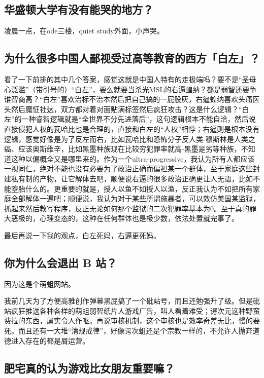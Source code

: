 \documentclass{ctexart}
\begin{document}
	\subsection{华盛顿大学有没有能哭的地方？}
	
	凌晨一点，在ode三楼，quiet study外面，小声哭。
	
	\subsection{为什么很多中国人鄙视受过高等教育的西方「白左」？}
	
	看了一下前排的其中几个答案，感觉这就是中国人特有的走极端吗？要不是“圣母心泛滥”（带引号的）“白左”，要么就要当杀光MSL的右逼蝗纳？都是弱智还要争谁智商高？“白左”喜欢治标不治本然后把自己搞的一屁股灰，右逼蝗纳喜欢头痛医头然后魔怔社达，双方都对着对面贴满标签然后疯狂攻击？这是什么逻辑？“白左”的一种睿智逻辑就是“全世界不分先进落后”，这句逻辑根本不能自洽，然后说直接侵犯人权的瓦哈比也是合理的，直接和白左的“人权”相悖；右逼则是根本没有逻辑，感觉好像是为了反左而右，比如瓦哈比和恐怖分子反人类-穆斯林是人类之癌、应该奥斯维辛，比如黑墨种族现在比较穷犯罪率就高-黑墨是劣等种族，不知道这种以偏概全又是哪里来的。作为一个ultra-progressive，我认为所有人都应该一视同仁，绝对不能也没有必要为了政治正确而偏袒某一个群体，至于家庭这些封建私有制的产物，让它解体去吧，顺便说右逼的很多政治正确更让人无语，比如不能堕胎什么的。更重要的就是，授人以鱼不如授人以渔，反正我认为不如把所有家庭全部解体一遍吧；顺便说，我认为对于某些所谓施暴者，可以效仿美国某监狱，抓起来然后教写程序，反正无论如何那个监狱的二次犯罪率基本为$0$。至于真的罪大恶极的，心理变态的，这种在任何群体也是极少数，依法处置就完事了。
	
	最后再说一下我的观点，白左死妈，右逼更死妈。
	
	\subsection{你为什么会退出 B 站？}
	
	因为这是个萌蛆网站。
	
	我前几天为了方便高雅创作弹幕黑屁搞了一个砒站号，而且还勉强升了级。但是砒站疯狂推送各种各样的萌蛆弱智纸片人游戏广告，叫人看着难受；谔次元这种野蛮费拉的东西，属实令人作呕。再说审核机制，这个审核也是效率奇差无比，慢的要死。而且还有一大堆“清规戒律”，好像谔次蛆还是个宗教一样的，不允许人抛弃道德进入存在的都是屑运营。
	
	\subsection{肥宅真的认为游戏比女朋友重要嘛？}
	
\end{document}
